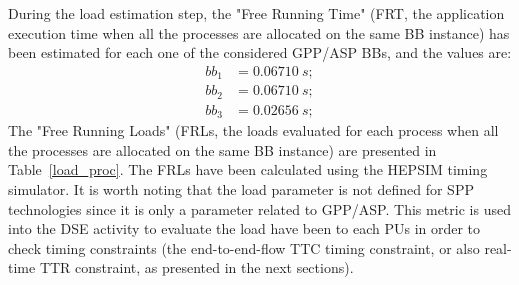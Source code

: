 \normalsize
%
During the load estimation step, the "Free Running Time" (FRT, the application execution time when all the processes are allocated on the same BB instance) has been estimated for each one of the considered GPP/ASP BBs, and the values are:
\footnotesize
\begin{align*}
    bb_1 &= 0.06710 \ s; \\
    bb_2 &= 0.06710 \ s; \\
    bb_3 &= 0.02656 \ s; 
\end{align*}
\normalsize
%
The "Free Running Loads" (FRLs, the loads evaluated for each process when all the processes are allocated on the same BB instance) are presented in Table~\ref{load_proc}. The FRLs have been calculated using the HEPSIM timing simulator.  It is worth noting that the load parameter is not defined for SPP technologies since it is only a parameter related to GPP/ASP.
This metric is used into the DSE activity to evaluate the load have been to each PUs in order to check timing constraints (the end-to-end-flow TTC timing constraint, or also real-time TTR constraint, as presented in the next sections). \par
%
\begin{table}[htbp]
\caption{Processes Free Running Load.}
\begin{center}
\label{load_proc}
\end{center}
\end{table}
